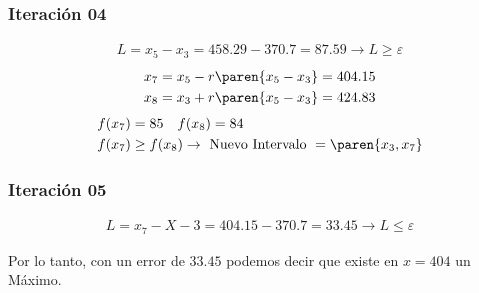 \begin{homeworkProblem}[-1][Hughesco]
\subsubsection{Iteración 04}
\begin{align*}
    L=x_5-x_3=458.29-370.7=87.59 \rightarrow L \geq \varepsilon
\end{align*}
\begin{align*}
    &x_7=x_5 - r\paren{x_5-x_3}= 404.15 \\
    &x_8=x_3 + r\paren{x_5-x_3}= 424.83
\end{align*}
\begin{align*}
    &f(x_7)=85 \quad f(x_8)=84 \\
    &f(x_7) \geq f(x_8) \rightarrow \text{ Nuevo Intervalo } = \paren{x_3,x_7}
\end{align*}

\subsubsection{Iteración 05}
\begin{align*}
    L=x_7-X-3=404.15-370.7=33.45 \rightarrow L \leq \varepsilon
\end{align*}

Por lo tanto, con un error de $33.45$ podemos decir que existe en $x=404$ un Máximo.

\end{homeworkProblem}